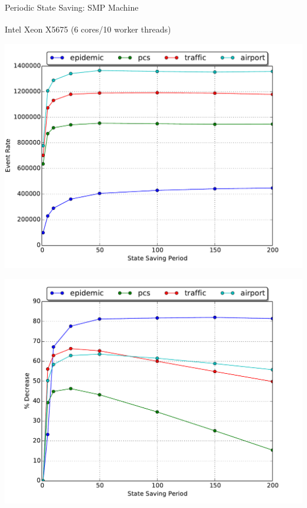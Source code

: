 \documentclass[10pt]{beamer}
\begin{document}
\begin{frame}{Periodic State Saving: SMP Machine}
    \begin{block}{Intel\textsuperscript{\textregistered} Xeon\textsuperscript{\textregistered} X5675 (6 cores/10 worker threads)}
        \bigskip
        \begin{minipage}{0.55\textwidth}
            \includegraphics[width=\textwidth]{../figs/state_saving/bc/eventrate.pdf}
        \end{minipage}%
        \begin{minipage}{0.55\textwidth}
            \includegraphics[width=\textwidth]{../figs/state_saving/bc/percent_memory_decrease.pdf}
        \end{minipage}
    \end{block}
\end{frame}
\end{document}
